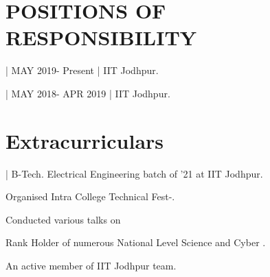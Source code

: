 \documentclass[]{deedy-resume-openfont}
\begin{document}
\begin{minipage}[t]{0.69\textwidth}

\section{POSITIONS OF RESPONSIBILITY} 
\vspace{10pt}
\begin{tightemize}
\item {} | MAY 2019- Present |  IIT Jodhpur.\\
 \item {} | MAY 2018- APR 2019 |  IIT Jodhpur.\\
 \end{tightemize}
\sectionsep


\section{Extracurriculars}
\vspace{10pt}
\begin{tightemize}
    \item {}| B-Tech. Electrical Engineering batch of '21 at IIT Jodhpur. 
    \item Organised Intra College Technical Fest-.
    \item Conducted various talks on 
    \item Rank Holder of numerous National Level Science and Cyber .
    \item An active member of IIT Jodhpur  team.
\end{tightemize}
\end{minipage} 
\end{document}
